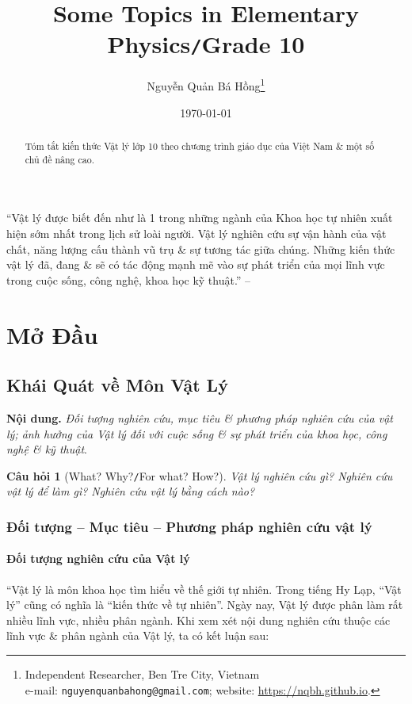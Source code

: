 \documentclass{article}
\title{Some Topics in Elementary Physics\texttt{/}Grade 10}
\author{Nguyễn Quản Bá Hồng\footnote{Independent Researcher, Ben Tre City, Vietnam\\e-mail: \texttt{nguyenquanbahong@gmail.com}; website: \url{https://nqbh.github.io}.}}
\date{\today}
\numberwithin{equation}{section}
\newtheorem{cauhoi}{Câu hỏi}[section]
\begin{document}
\maketitle
\begin{abstract}
	Tóm tắt kiến thức Vật lý lớp 10 theo chương trình giáo dục của Việt Nam \& một số chủ đề nâng cao.
\end{abstract}
\setcounter{secnumdepth}{4}
\setcounter{tocdepth}{3}
\tableofcontents
\newpage


``Vật lý được biết đến như là 1 trong những ngành của Khoa học tự nhiên xuất hiện sớm nhất trong lịch sử loài người. Vật lý nghiên cứu sự vận hành của vật chất, năng lượng cấu thành vũ trụ \& sự tương tác giữa chúng. Những kiến thức vật lý đã, đang \& sẽ có tác động mạnh mẽ vào sự phát triển của mọi lĩnh vực trong cuộc sống, công nghệ, khoa học kỹ thuật.'' -- \cite[p. 3]{SGK_Vat_Ly_10_Chan_Troi_Sang_Tao}


\section{Mở Đầu}

\subsection{Khái Quát về Môn Vật Lý}
\textbf{Nội dung.} \textit{Đối tượng nghiên cứu, mục tiêu \& phương pháp nghiên cứu của vật lý; ảnh hưởng của Vật lý đối với cuộc sống \& sự phát triển của khoa học, công nghệ \& kỹ thuật}.

\begin{cauhoi}[What? Why?\texttt{/}For what? How?]
	Vật lý nghiên cứu gì? Nghiên cứu vật lý để làm gì? Nghiên cứu vật lý bằng cách nào?
\end{cauhoi}

\subsubsection{Đối tượng -- Mục tiêu -- Phương pháp nghiên cứu vật lý}

\paragraph{Đối tượng nghiên cứu của Vật lý}
``Vật lý là môn khoa học tìm hiểu về thế giới tự nhiên. Trong tiếng Hy Lạp, ``Vật lý'' cũng có nghĩa là ``kiến thức về tự nhiên''. Ngày nay, Vật lý được phân làm rất nhiều lĩnh vực, nhiều phân ngành. Khi xem xét nội dung nghiên cứu thuộc các lĩnh vực \& phân ngành của Vật lý, ta có kết luận sau:
\end{document}

